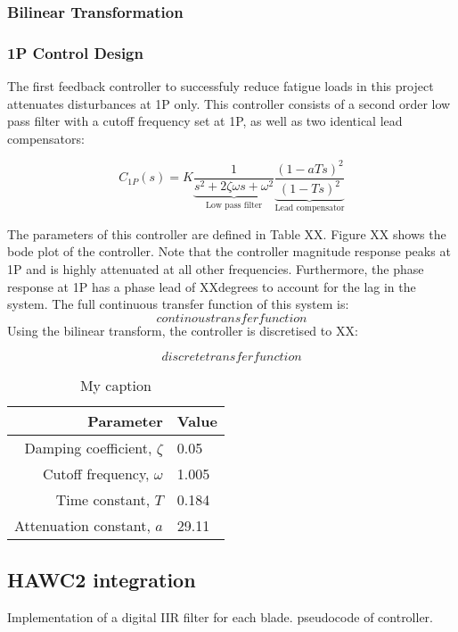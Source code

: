 \subsubsection{Bilinear Transformation}

\subsubsection{1P Control Design}
The first feedback controller to successfuly reduce fatigue loads in this project attenuates disturbances at 1P only. This controller consists of a second order low pass filter with a cutoff frequency set at 1P, as well as two identical lead compensators:

$$C_{1P}(s) = K\underbrace{\frac{1}{s^2 + 2\zeta\omega s + \omega^2}}_\text{Low pass filter}\underbrace{\frac{(1-aTs)^2}{(1-Ts)^2}}_\text{Lead compensator}$$

The parameters of this controller are defined in Table XX. Figure XX shows the bode plot of the controller. Note that the controller magnitude response peaks at 1P and is highly attenuated at all other frequencies. Furthermore, the phase response at 1P has a phase lead of XXdegrees to account for the lag in the system. The full continuous transfer function of this system is:
$$continoustransfer function$$
Using the bilinear transform, the controller is discretised to XX:


$$discrete transfer function$$
\begin{table}[]
\centering
\caption{My caption}
\label{my-label}
\begin{tabular}{r|l}
\textbf{Parameter}           & \textbf{Value} \\ \hline
Damping coefficient, $\zeta$ & 0.05           \\
Cutoff frequency, $\omega$   & 1.005          \\
Time constant, $T$           & 0.184          \\
Attenuation constant, $a$    & 29.11         
\end{tabular}
\end{table}
\subsection{HAWC2 integration}
Implementation of a digital IIR filter for each blade.
pseudocode of controller.